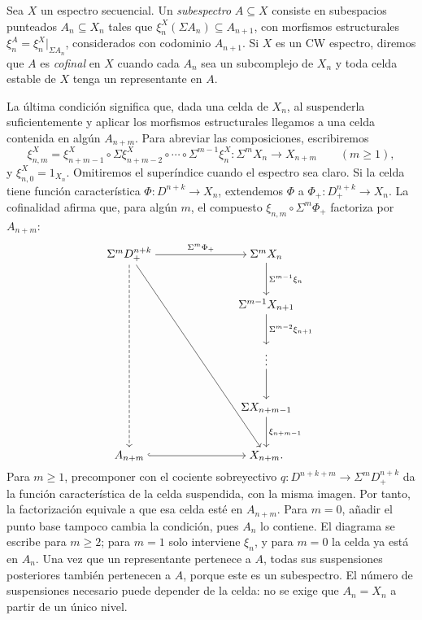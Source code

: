 \begin{defi}\label{defi:c11-subespectro-cofinal}
Sea $X$ un espectro secuencial. Un \emph{subespectro} $A\subseteq X$ consiste en subespacios punteados $A_n\subseteq X_n$ tales que $\xi^X_n(\Sigma A_n)\subseteq A_{n+1}$, con morfismos estructurales $\xi^A_n=\xi^X_n|_{\Sigma A_n}$, considerados con codominio $A_{n+1}$. Si $X$ es un CW espectro, diremos que $A$ es \emph{cofinal} en $X$ cuando cada $A_n$ sea un subcomplejo de $X_n$ y toda celda estable de $X$ tenga un representante en $A$.
\end{defi}

La última condición significa que, dada una celda de $X_n$, al suspenderla suficientemente y aplicar los morfismos estructurales llegamos a una celda contenida en algún $A_{n+m}$. Para abreviar las composiciones, escribiremos
\[
\xi^X_{n,m}
=\xi^X_{n+m-1}\circ\Sigma\xi^X_{n+m-2}\circ\cdots
\circ\Sigma^{m-1}\xi^X_n\colon\Sigma^mX_n\longrightarrow X_{n+m}
\qquad(m\ge1),
\]
y $\xi^X_{n,0}=1_{X_n}$. Omitiremos el superíndice cuando el espectro sea claro. Si la celda tiene función característica $\Phi\colon D^{n+k}\to X_n$, extendemos $\Phi$ a $\Phi_+\colon D^{n+k}_+\to X_n$. La cofinalidad afirma que, para algún $m$, el compuesto $\xi_{n,m}\circ\Sigma^m\Phi_+$ factoriza por $A_{n+m}$:
\[
\begin{tikzcd}[cramped,column sep=7em,row sep=large]
\Sigma^mD^{n+k}_+
\arrow[r,"\Sigma^m\Phi_+"]
\arrow[dddd,dashed] \arrow[ddddr]
& \Sigma^mX_n \arrow[d,"\Sigma^{m-1}\xi_n"]\\
& \Sigma^{m-1}X_{n+1} \arrow[d,"\Sigma^{m-2}\xi_{n+1}"]\\
& \vdots \arrow[d]\\
& \Sigma X_{n+m-1} \arrow[d,"\xi_{n+m-1}"]\\
A_{n+m} \arrow[r,hook] & X_{n+m}.
\end{tikzcd}
\]
Para $m\ge1$, precomponer con el cociente sobreyectivo $q\colon D^{n+k+m}\to\Sigma^mD^{n+k}_+$ da la función característica de la celda suspendida, con la misma imagen. Por tanto, la factorización equivale a que esa celda esté en $A_{n+m}$. Para $m=0$, añadir el punto base tampoco cambia la condición, pues $A_n$ lo contiene. El diagrama se escribe para $m\ge2$; para $m=1$ solo interviene $\xi_n$, y para $m=0$ la celda ya está en $A_n$. Una vez que un representante pertenece a $A$, todas sus suspensiones posteriores también pertenecen a $A$, porque este es un subespectro. El número de suspensiones necesario puede depender de la celda: no se exige que $A_n=X_n$ a partir de un único nivel.

